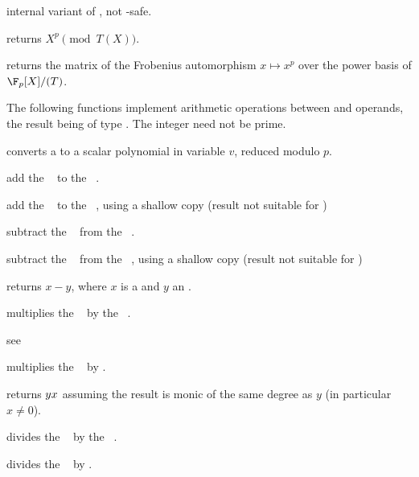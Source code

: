  internal variant of
, not -safe.

 returns $X^{p}\pmod{T(X)}$.

 returns the matrix of the
Frobenius automorphism $x\mapsto x^p$ over the power basis of $\F_p[X]/(T)$.

The following functions implement arithmetic operations between 
and  operands, the result being of type . The integer
 need not be prime.

 converts a  to a scalar
polynomial in variable $v$, reduced modulo $p$.

 add the ~ to the
~.

 add the ~
to the ~, using a shallow copy (result not suitable for
)

 subtract the ~ from
the ~.

 subtract the
~ from the ~, using a shallow copy (result not
suitable for )

 returns $x - y$, where $x$ is
a  and $y$ an .

 multiplies the ~
by the ~.

 see 

 multiplies the ~
by .

 returns $y\*x$ assuming the
result is monic of the same degree as $y$ (in particular $x\neq 0$).

 divides the ~
by the ~.

 divides the ~
by .


